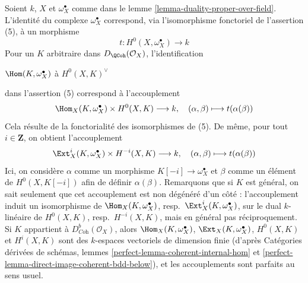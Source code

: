 \begin{remark}
\label{remark-duality-proper-over-field}
Soient $k$, $X$ et $\omega_X^\bullet$ comme dans le lemme \ref{lemma-duality-proper-over-field}. L'identité du complexe $\omega_X^\bullet$ correspond, via l'isomorphisme fonctoriel de l'assertion (5), à un morphisme
$$
t : H^0(X, \omega_X^\bullet) \longrightarrow k
$$
Pour un $K$ arbitraire dans $D_\QCoh(\mathcal{O}_X)$, l'identification
\par\noindent\hfil
$\Hom(K, \omega_X^\bullet)$ à $H^0(X, K)^\vee$
\hfil\par\noindent
dans l'assertion (5) correspond à l'accouplement
$$
\Hom_X(K, \omega_X^\bullet) \times H^0(X, K) \longrightarrow k,\quad
(\alpha, \beta) \longmapsto t(\alpha(\beta))
$$
Cela résulte de la fonctorialité des isomorphismes de (5). De même, pour tout $i \in \mathbf{Z}$, on obtient l'accouplement
$$
\Ext^i_X(K, \omega_X^\bullet) \times H^{-i}(X, K) \longrightarrow k,\quad
(\alpha, \beta) \longmapsto t(\alpha(\beta))
$$
Ici, on considère $\alpha$ comme un morphisme $K[-i] \to \omega_X^\bullet$ et $\beta$ comme un élément de $H^0(X, K[-i])$ afin de définir $\alpha(\beta)$. Remarquons que si $K$ est général, on sait seulement que cet accouplement est non dégénéré d'un côté : l'accouplement induit un isomorphisme de $\Hom_X(K, \omega_X^\bullet)$, resp.\ $\Ext^i_X(K, \omega_X^\bullet)$, sur le dual $k$-linéaire de $H^0(X, K)$, resp.\ $H^{-i}(X, K)$, mais en général pas réciproquement. Si $K$ appartient à $D^b_{\textit{Coh}}(\mathcal{O}_X)$, alors $\Hom_X(K, \omega_X^\bullet)$, $\Ext_X(K, \omega_X^\bullet)$, $H^0(X, K)$ et $H^i(X, K)$ sont des $k$-espaces vectoriels de dimension finie (d'après Catégories dérivées de schémas, lemmes \ref{perfect-lemma-coherent-internal-hom} et \ref{perfect-lemma-direct-image-coherent-bdd-below}), et les accouplements sont parfaits au sens usuel.
\end{remark}

